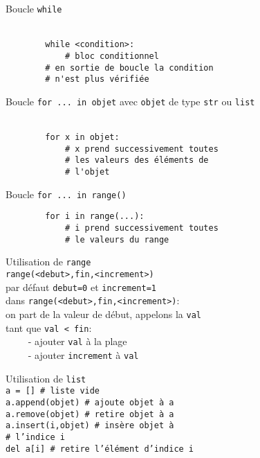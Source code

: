 \documentclass[10pt, a4paper,article,landscape]{nsi}
\newcommand{\tit}[1]{{\large\color{UGLiBlue}\titlefont #1}\\}
\begin{document}
\begin{multicols}{3}
    \tit{Boucle \texttt{while}}\\[-3.5em]
    \begin{verbatim}
        while <condition>:
            # bloc conditionnel
        # en sortie de boucle la condition
        # n'est plus vérifiée
    \end{verbatim}

    \columnbreak

    \tit{Boucle \texttt{for ... in objet} avec \texttt{objet} de type \texttt{str} ou \texttt{list}}\\[-3em]
    \begin{verbatim}
        for x in objet:
            # x prend successivement toutes 
            # les valeurs des éléments de 
            # l'objet
    \end{verbatim}
    \tit{Boucle \texttt{for ... in range()}}
    \begin{verbatim}
        for i in range(...):
            # i prend successivement toutes 
            # le valeurs du range
    \end{verbatim}

    \tit{Utilisation de \texttt{range}}

    \texttt{range(<debut>,fin,<increment>)}\\
    par défaut \texttt{debut=0} et \texttt{increment=1}\\

    dans \texttt{range(<debut>,fin,<increment>)}:\\
    on part de la valeur de début, appelons la \texttt{val}\\
    tant que \texttt{val < fin}:\\
    $\qquad$ - ajouter \texttt{val} à la plage\\
    $\qquad$ - ajouter \texttt{increment} à \texttt{val}\\

    \columnbreak

    \tit{Utilisation de \texttt{list}}

    \texttt{a = [] # liste vide}\\
    \texttt{a.append(objet) # ajoute objet à a}\\
    \texttt{a.remove(objet) # retire objet à a}\\
    \texttt{a.insert(i,objet) # insère objet à}\\
    \texttt{# l'indice i}\\
    \texttt{del a[i] # retire l'élément d'indice i}\\



    
\end{multicols}
\end{document}
